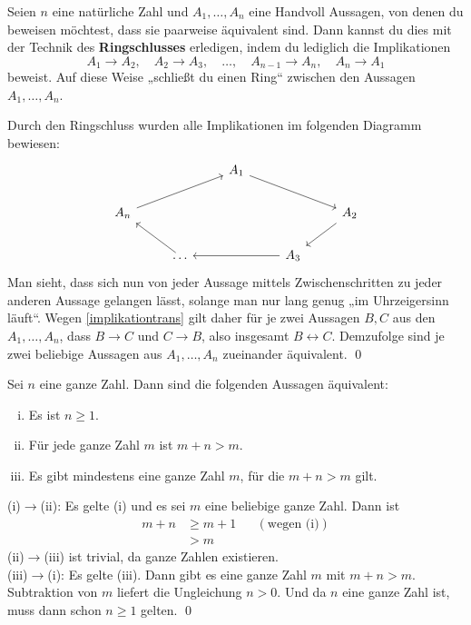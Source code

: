 \begin{satz}[Ringschluss] \label{ringschluss} 
    Seien $n$ eine natürliche Zahl und $A_1,\dots , A_n$ eine Handvoll Aussagen, von denen du beweisen möchtest, dass sie paarweise äquivalent sind. Dann kannst du dies mit der Technik des \textbf{Ringschlusses} erledigen, indem du lediglich die Implikationen
        \[ A_1\to A_2,\quad A_2\to A_3,\quad \dots ,\quad A_{n-1}\to A_n,\quad A_n\to A_1 \]
    beweist. Auf diese Weise „schließt du einen Ring“ zwischen den Aussagen $A_1,\dots , A_n$.
\end{satz}


\begin{bew}
    Durch den Ringschluss wurden alle Implikationen im folgenden Diagramm bewiesen:
    \[\begin{tikzcd}
        &&& A_1 \ar[rrd] &&& \\
        &A_n\ar[rru]&&&& A_2 \ar[ld]& \\
        && \dots \ar[lu] && A_3 \ar[ll]&& 
    \end{tikzcd} \]
    Man sieht, dass sich nun von jeder Aussage mittels Zwischenschritten zu jeder anderen Aussage gelangen lässt, solange man nur lang genug „im Uhrzeigersinn läuft“. Wegen \cref{implikationtrans} gilt daher für je zwei Aussagen $B,C$ aus den $A_1,\dots , A_n$, dass $B\to C$ und $C\to B$, also insgesamt $B\leftrightarrow C$. Demzufolge sind je zwei beliebige Aussagen aus $A_1,\dots , A_n$ zueinander äquivalent. \qed
\end{bew}


\begin{bsp} \label{bsp:ringschluss}
    Sei $n$ eine ganze Zahl. Dann sind die folgenden Aussagen äquivalent:
    \begin{enumerate}[(i)]
        \item Es ist $n\ge 1$.
        \item Für jede ganze Zahl $m$ ist $m+n>m$.
        \item Es gibt mindestens eine ganze Zahl $m$, für die $m+n>m$ gilt.
    \end{enumerate}
\end{bsp}


\begin{bew}
    (i)$\to$(ii): Es gelte (i) und es sei $m$ eine beliebige ganze Zahl. Dann ist
    \begin{align*}
        m+n & \ge m+1 && (\text{wegen (i)}) \\
        & > m
    \end{align*}
    (ii)$\to$(iii) ist trivial, da ganze Zahlen existieren. \\[0.5em]
    (iii)$\to$(i): Es gelte (iii). Dann gibt es eine ganze Zahl $m$ mit $m+n>m$. Subtraktion von $m$ liefert die Ungleichung $n>0$. Und da $n$ eine ganze Zahl ist, muss dann schon $n\ge 1$ gelten. \qed
\end{bew}


